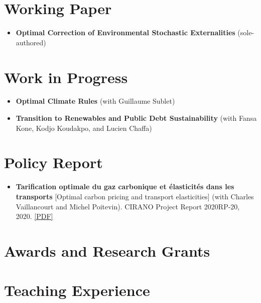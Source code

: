 \documentclass[11pt,letterpaper]{article}
\newcommand{\when}[1]{{\unskip\nobreak\hfil\penalty50\hskip1em\hbox{}\nobreak\hfill #1%
  \parfillskip=0pt\finalhyphendemerits=0\par}}
\newif\ifpaperlinks
\newcommand{\paperlink}[1]{\ifpaperlinks\href{#1}{[PDF]}\fi}
\begin{document}
\section*{Working Paper}

\begin{itemize}
\item \textbf{Optimal Correction of Environmental Stochastic Externalities} (sole-authored) \paperlink{https://alexandrepavlov.com/documents/Stochastic-Externalities.pdf}
\end{itemize}

\section*{Work in Progress}

\begin{itemize}
\item \textbf{Optimal Climate Rules} (with Guillaume Sublet)
\item \textbf{Transition to Renewables and Public Debt Sustainability} (with Fansa Kone, Kodjo Koudakpo, and Lucien Chaffa)
\end{itemize}

\section*{Policy Report}

\begin{itemize}
\item \textbf{Tarification optimale du gaz carbonique et élasticités dans les transports} [Optimal carbon pricing and transport elasticities] (with Charles Vaillancourt and Michel Poitevin). CIRANO Project Report 2020RP-20, 2020. \href{https://cirano.qc.ca/files/publications/2020RP-20.pdf}{[PDF]}
\end{itemize}

\section*{Awards and Research Grants}


\section*{Teaching Experience}
\end{document}
